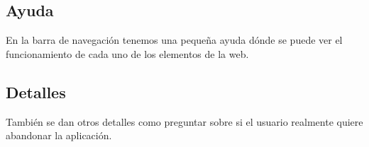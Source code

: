 \subsection{Ayuda}
En la barra de navegación tenemos una pequeña ayuda dónde se puede ver el funcionamiento de cada uno de los elementos de la web. 



\subsection{Detalles}
También se dan otros detalles como preguntar sobre si el usuario realmente quiere abandonar la aplicación.








